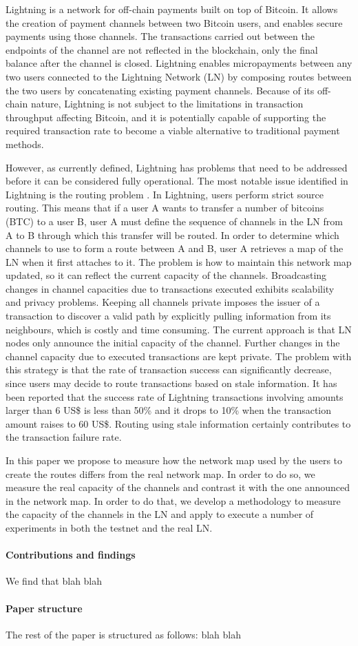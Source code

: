 Lightning is a network for off-chain payments built on top of Bitcoin. It allows the creation of payment channels between two Bitcoin users, and enables secure payments using those channels. The transactions carried out between the endpoints of the channel are not reflected in the blockchain, only the final balance after the channel is closed.  Lightning enables micropayments between any two users connected to the Lightning Network  (LN) by composing routes between the two users by concatenating existing payment channels. Because of its off-chain nature, Lightning is not subject to the limitations in transaction throughput affecting Bitcoin, and it is potentially capable of supporting the required transaction rate to become a viable alternative to traditional payment methods.

However, as currently defined, Lightning has problems that need to be addressed before it can be considered fully operational. The most notable issue identified in Lightning is the routing problem \cite{5}. In Lightning, users perform strict source routing. This means that if a user A wants to transfer a number of bitcoins (BTC) to a user B, user A must define the sequence of channels in the LN from A to B through which this transfer will be routed. In order to determine which channels to use to form a route between A and B, user A retrieves a map of the LN when it first attaches to it. The problem is how to maintain this network map updated, so it can reflect the current capacity of the channels. Broadcasting changes in channel capacities due to transactions executed exhibits scalability and privacy problems. Keeping all channels private imposes the issuer of a transaction to discover a valid path by explicitly pulling information from its neighbours, which is costly and time consuming. The current approach is that LN nodes only announce the initial capacity of the channel. Further changes in the channel capacity due to executed transactions are kept private. The problem with this strategy is that the rate of transaction success can significantly decrease, since users may decide to route transactions based on stale information. It has been reported \cite{6} that the success rate of Lightning transactions involving amounts larger than 6 US\$ is less than 50\% and it drops to 10\% when the transaction amount raises to 60 US\$.  Routing using stale information certainly contributes to the transaction failure rate. 

In this paper we propose to measure how the network map used by the users to create the routes differs from the real network map. In order to do so, we measure the real capacity of the channels and contrast it with the one announced in the network map. In order to do that, we develop a methodology to measure the capacity of the channels in the LN and apply to execute a number of experiments in both the testnet and the real LN. 

\paragraph{Contributions and findings}
We find that blah blah

\paragraph{Paper structure}
The rest of the paper is structured as follows: blah blah
